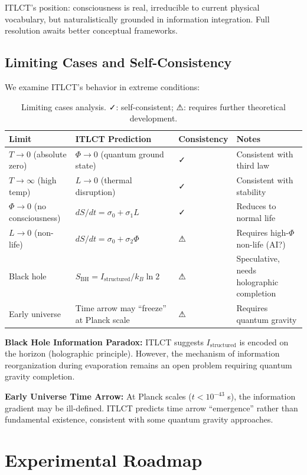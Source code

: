 \documentclass[12pt,a4paper]{article}
\begin{document}
ITLCT's position: consciousness is real, irreducible to current physical vocabulary, but naturalistically grounded in information integration. Full resolution awaits better conceptual frameworks.

\subsection{Limiting Cases and Self-Consistency}

We examine ITLCT's behavior in extreme conditions:

\begin{table}[h]
\centering
\begin{tabular}{@{}llll@{}}
\toprule
\textbf{Limit} & \textbf{ITLCT Prediction} & \textbf{Consistency} & \textbf{Notes} \\
\midrule
$T \to 0$ (absolute zero) & $\Phi \to 0$ (quantum ground state) & ✓ & Consistent with third law \\
$T \to \infty$ (high temp) & $L \to 0$ (thermal disruption) & ✓ & Consistent with stability \\
$\Phi \to 0$ (no consciousness) & $dS/dt = \sigma_0 + \sigma_1 L$ & ✓ & Reduces to normal life \\
$L \to 0$ (non-life) & $dS/dt = \sigma_0 + \sigma_2 \Phi$ & ⚠ & Requires high-$\Phi$ non-life (AI?) \\
Black hole & $S_{\text{BH}} = I_{\text{structured}}/k_B \ln 2$ & ⚠ & Speculative, needs holographic completion \\
Early universe & Time arrow may ``freeze'' at Planck scale & ⚠ & Requires quantum gravity \\
\bottomrule
\end{tabular}
\caption{Limiting cases analysis. ✓: self-consistent; ⚠: requires further theoretical development.}
\end{table}

\textbf{Black Hole Information Paradox:} ITLCT suggests $I_{\text{structured}}$ is encoded on the horizon (holographic principle). However, the mechanism of information reorganization during evaporation remains an open problem requiring quantum gravity completion.

\textbf{Early Universe Time Arrow:} At Planck scales ($t < 10^{-43}$ s), the information gradient may be ill-defined. ITLCT predicts time arrow ``emergence'' rather than fundamental existence, consistent with some quantum gravity approaches.

\section{Experimental Roadmap}
\end{document}
